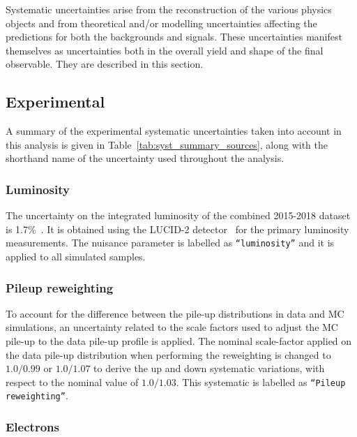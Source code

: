 %
Systematic uncertainties arise from the reconstruction of the various physics objects and from theoretical and/or modelling uncertainties affecting the predictions for both the backgrounds and signals. These uncertainties manifest themselves as uncertainties both in the overall yield and shape of the final observable. They are described in this section.

\subsection{Experimental}

A summary of the experimental systematic uncertainties taken into account in this analysis is given in Table~\ref{tab:syst_summary_sources}, along with the shorthand name of the uncertainty used throughout the analysis. 


\subsubsection{Luminosity}

The uncertainty on the integrated luminosity of the combined 2015-2018 dataset is 1.7\%~\cite{ATLAS-CONF-2019-021}. It is obtained using the LUCID-2 detector~\cite{Avoni_2018} for the primary luminosity measurements. The  nuisance parameter is labelled as  \texttt{``luminosity''} and it is applied to all simulated samples. 


\subsubsection{Pileup reweighting}

To account for the difference between the pile-up distributions in data and MC simulations, an uncertainty related to the scale factors used to adjust the MC pile-up to the data pile-up profile is applied. 
The nominal scale-factor applied on the data pile-up distribution when performing the reweighting is changed to $1.0/0.99$ or $1.0/1.07$ to derive the up and down systematic variations, with respect to the nominal value of $1.0/1.03$. This systematic is labelled as  \texttt{``Pileup reweighting''}.


\subsubsection{Electrons}

